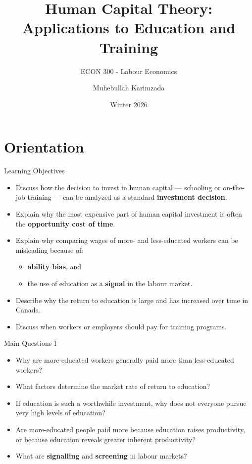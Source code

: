 \documentclass[aspectratio=169]{beamer}
\title{\textbf{Human Capital Theory: Applications to Education and Training}}
\subtitle{{\large ECON 300 - Labour Economics}}
\author{Muhebullah Karimzada}
\date{Winter 2026}
\begin{document}
\begin{frame}[plain]
  \titlepage
\end{frame}

\section{Orientation}

\begin{frame}{Learning Objectives}
\transfade
\begin{itemize}[<+->]
  \item Discuss how the decision to invest in human capital --- schooling or on-the-job training --- can be analyzed as a standard \textbf{investment decision}.
  \item Explain why the most expensive part of human capital investment is often the \textbf{opportunity cost of time}.
  \item Explain why comparing wages of more- and less-educated workers can be misleading because of:
  \begin{itemize}[<+->]
    \item \textbf{ability bias}, and
    \item the use of education as a \textbf{signal} in the labour market.
  \end{itemize}
  \item Describe why the return to education is large and has increased over time in Canada.
  \item Discuss when workers or employers should pay for training programs.
\end{itemize}
\end{frame}

\begin{frame}{Main Questions I}
\transfade
\begin{itemize}[<+->]
  \item Why are more-educated workers generally paid more than less-educated workers?
  \item What factors determine the market rate of return to education?
  \item If education is such a worthwhile investment, why does not everyone pursue very high levels of education?
  \item Are more-educated people paid more because education raises productivity, or because education reveals greater inherent productivity?
  \item What are \textbf{signalling} and \textbf{screening} in labour markets?
\end{itemize}
\end{frame}
\end{document}

